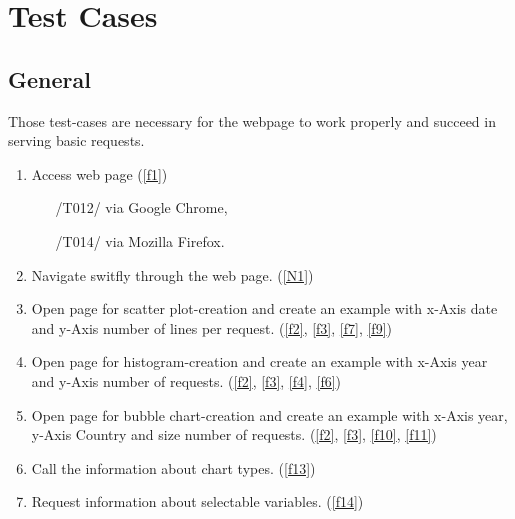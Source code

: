 \section{Test Cases}



\subsection{General}

Those test-cases are necessary for the webpage to work 
properly and succeed in serving basic requests.

\begin{enumerate}[label={{/T}\itemnumber*{/}}, series=test]

\item Access web page (\ref{f1})
\begin{enumerate}
  \item[/T012/] via Google Chrome,
  \item[/T014/] via Mozilla Firefox.
\end{enumerate}
\label{t10}

\item Navigate switfly through the web page. (\ref{N1}) 
\label{t11}

\item Open page for scatter plot-creation and create an example
      with x-Axis date and y-Axis number of lines per request. (\ref{f2}, \ref{f3}, \ref{f7}, \ref{f9})
\label{t12}

\item Open page for histogram-creation and create an example
      with x-Axis year and y-Axis number of requests. (\ref{f2}, \ref{f3}, \ref{f4}, \ref{f6})
\label{t13}

\item Open page for bubble chart-creation and create an example
      with x-Axis year, y-Axis Country and size number of requests. (\ref{f2}, \ref{f3}, \ref{f10}, \ref{f11})
\label{t14}

\item Call the information about chart types. (\ref{f13})
\label{t15}

\item Request information about selectable variables. (\ref{f14})
\label{t16}

\end{enumerate}

